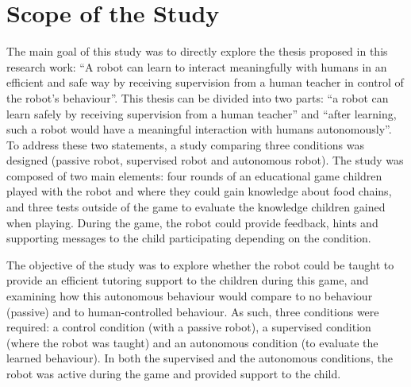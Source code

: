 \section{Scope of the Study} \label{sec:tutoring_scope}

The main goal of this study was to directly explore the thesis proposed in this research work: ``A robot can learn to interact meaningfully with humans in an efficient and safe way by receiving supervision from a human teacher in control of the robot's behaviour''. This thesis can be divided into two parts: ``a robot can learn safely by receiving supervision from a human teacher'' and ``after learning, such a robot would have a meaningful interaction with humans autonomously''. To address these two statements, a study comparing three conditions was designed (passive robot, supervised robot and autonomous robot). The study was composed of two main elements: four rounds of an educational game children played with the robot and where they could gain knowledge about food chains, and three tests outside of the game to evaluate the knowledge children gained when playing. During the game, the robot could provide feedback, hints and supporting messages to the child participating depending on the condition. 

The objective of the study was to explore whether the robot could be taught to provide an efficient tutoring support to the children during this game, 
and examining how this autonomous behaviour would compare to no behaviour (passive) and to human-controlled behaviour. As such, three conditions were required: a control condition (with a passive robot), a supervised condition (where the robot was taught) and an autonomous condition (to evaluate the learned behaviour). In both the supervised and the autonomous conditions, the robot was active during the game and provided support to the child.


